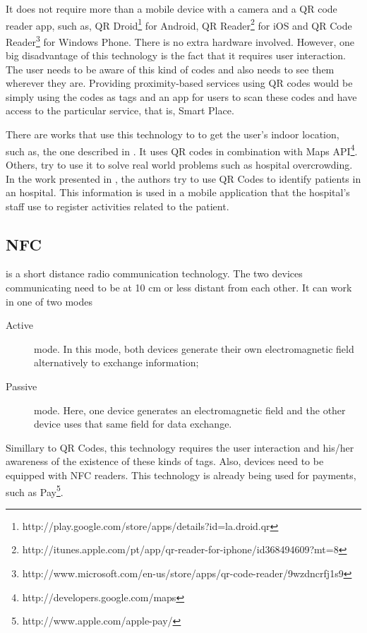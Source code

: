 It does not require more than a mobile device with a camera and a \gls{QR} code reader app, such as, QR Droid\footnote{http://play.google.com/store/apps/details?id=la.droid.qr} for Android, QR Reader\footnote{http://itunes.apple.com/pt/app/qr-reader-for-iphone/id368494609?mt=8} for iOS and QR Code Reader\footnote{http://www.microsoft.com/en-us/store/apps/qr-code-reader/9wzdncrfj1s9} for Windows Phone.
There is no extra hardware involved.
However, one big disadvantage of this technology is the fact that it requires user interaction.
The user needs to be aware of this kind of codes and also needs to see them wherever they are.
Providing proximity-based services using \gls{QR} codes would be simply using the codes as tags and an app for users to scan these codes and have access to the particular service, that is, Smart Place.

There are works that use this technology to to get the user's indoor location, such as, the one described in \cite{qr_indoor}.
It uses \gls{QR} codes in combination with  Maps \gls{API}\footnote{http://developers.google.com/maps}.
Others, try to use it to solve real world problems such as hospital overcrowding.
In the work presented in \cite{qr_hospital}, the authors try to use \gls{QR} Codes to identify patients in an hospital.
This information is used in a mobile application that the hospital's staff use to register activities related to the patient.

\subsection{NFC}
\label{sub:background_near_field _communication}
\cite{nfc} is a short distance radio communication technology.
The two devices communicating need to be at 10 cm or less distant from each other.
It can work in one of two modes
\begin{description}
  \item[Active] mode. In this mode, both devices generate their own electromagnetic field alternatively to exchange information;
  \item[Passive] mode. Here, one device generates an electromagnetic field and the other device uses that same field for data exchange.
\end{description}

Simillary to \gls{QR} Codes, this technology requires the user interaction and his/her awareness of the existence of these kinds of tags.
Also, devices need to be equipped with \gls{NFC} readers.
This technology is already being used for payments, such as  Pay\footnote{http://www.apple.com/apple-pay/}.

